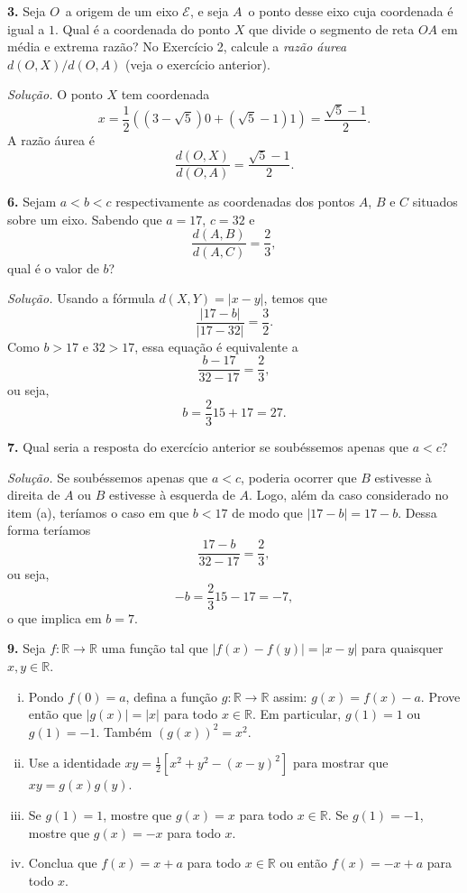 \documentclass[a4paper,11pt]{article}
\newcommand{\R}{\mathbb{R}}
\begin{document}
\textbf{3.}
Seja $O\,$ a origem de um eixo $\mathcal{E}$, e seja $A\,$ o ponto desse eixo cuja coordenada é igual a $1$.
Qual é a coordenada do ponto $X$ que divide o segmento de reta $OA$ em média e extrema razão?
No Exercício 2, calcule a \emph{razão áurea} $d(O,X)/d(O,A)$ (veja o exercício anterior).

\vspace{\baselineskip}

\emph{Solução.}
O ponto $X$ tem coordenada
\[
  x = \frac{1}{2} ( (3-\sqrt{5}) 0 + (\sqrt{5}-1) 1 ) = \frac{\sqrt{5}-1}{2}.
\]
A razão áurea é
\[
  \frac{d(O,X)}{d(O,A)} = \frac{\sqrt{5}-1}{2}.
\]

\vspace{\baselineskip}

\textbf{6.}
Sejam $a < b < c$ respectivamente as coordenadas dos pontos $A$, $B$ e $C$ situados sobre um eixo.
Sabendo que $a = 17$, $c = 32$ e
\[
  \frac{d(A,B)}{d(A,C)} = \frac{2}{3},
\]
qual é o valor de $b$?

\vspace{\baselineskip}

\emph{Solução.}
Usando a fórmula $d(X,Y) = |x-y|$, temos que
\[
  \frac{|17-b|}{|17-32|} = \frac{3}{2}.
\]
Como $b > 17$ e $32 > 17$, essa equação é equivalente a
\[
  \frac{b-17}{32-17} = \frac{2}{3},
\]
ou seja,
\[
  b = \frac{2}{3} 15 + 17 = 27.
\]

\vspace{\baselineskip}

\textbf{7.}
Qual seria a resposta do exercício anterior se soubéssemos apenas que $a < c$?

\vspace{\baselineskip}

\emph{Solução.}
Se soubéssemos apenas que $a < c$, poderia ocorrer que $B$ estivesse à direita de $A$ ou $B$ estivesse à esquerda de $A$.
Logo, além da caso considerado no item (a), teríamos o caso em que $b < 17$ de modo que $|17-b| = 17-b$.
Dessa forma teríamos
\[
  \frac{17-b}{32-17} = \frac{2}{3},
\]
ou seja,
\[
  -b = \frac{2}{3} 15 - 17 = -7,
\]
o que implica em $b = 7$.

\vspace{\baselineskip}

\textbf{9.}
Seja $f : \R \to \R$ uma função tal que $|f(x)-f(y)| = |x-y|$ para quaisquer $x,y \in \R$.
\begin{enumerate}[(i)]
  \item
    Pondo $f(0) = a$, defina a função $g : \R \to \R$ assim: $g(x) = f(x) - a$.
    Prove então que $|g(x)| = |x|$ para todo $x \in \R$.
    Em particular, $g(1) = 1$ ou $g(1) = -1$.
    Também $(g(x))^2 = x^2$.
  \item
    Use a identidade $xy = \frac{1}{2}[ x^2 + y^2 - (x-y)^2 ]$ para mostrar que $xy = g(x) g(y)$.
  \item
    Se $g(1) = 1$, mostre que $g(x) = x$ para todo $x \in \R$.
    Se $g(1) = -1$, mostre que $g(x) = -x$ para todo $x$.
  \item
    Conclua que $f(x) = x + a$ para todo $x \in \R$ ou então $f(x) = -x + a$ para todo $x$.
\end{enumerate}
\end{document}
